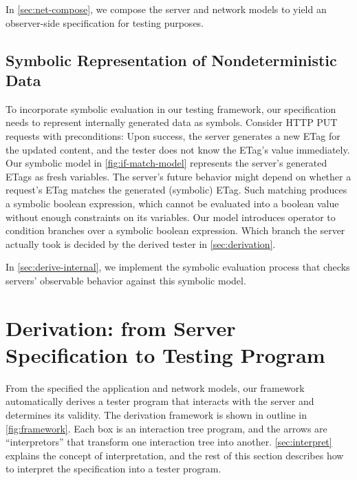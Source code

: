 In \autoref{sec:net-compose}, we compose the server and network models to yield an
observer-side specification for testing purposes.

\subsection{Symbolic Representation of Nondeterministic Data}
\label{sec:symbolic-model}

To incorporate symbolic evaluation in our testing framework, our specification
needs to represent internally generated data as symbols.  Consider HTTP
PUT requests with  preconditions: Upon success, the server
generates a new ETag for the updated content, and the tester does not know the
ETag's value immediately.  Our symbolic model in \autoref{fig:if-match-model}
represents the server's generated ETags as fresh variables.  The server's future
behavior might depend on whether a request's ETag matches the generated
(symbolic) ETag.  Such matching produces a symbolic boolean expression, which
cannot be evaluated into a boolean value without enough constraints on its
variables.  Our model introduces  operator to condition branches over
a symbolic boolean expression.  Which branch the server actually took is decided
by the derived tester in \autoref{sec:derivation}.

In \autoref{sec:derive-internal}, we implement the symbolic evaluation process
that checks servers' observable behavior against this symbolic model.

\section{Derivation: from Server Specification to Testing Program}
From the specified the application and network models,
our framework automatically derives a tester program that
interacts with the server and determines its validity.  The derivation framework
is shown in outline in \autoref{fig:framework}.  Each box is an interaction tree
program, and the arrows are
``interpretors'' that transform one interaction tree into another.
\autoref{sec:interpret} explains the concept of interpretation, and the rest of
this section describes how to interpret the specification into a tester program.

